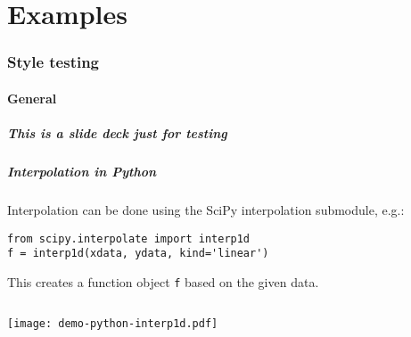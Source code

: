 \part{Examples}
\section{Style testing}
\subsection*{General}
\begin{frame}[label=contents_sample]
  \frametitle{This is a slide deck just for testing}
\end{frame}

{\nologo
\begin{frame}[fragile]
  \frametitle{Interpolation in Python}
  Interpolation can be done using the SciPy interpolation submodule, e.g.:
  \begin{lstlisting}
from scipy.interpolate import interp1d
f = interp1d(xdata, ydata, kind='linear')
  \end{lstlisting}
  This creates a function object \lstinline|f| based on the given data.\pause
  \begin{columns}[T]
        
    \pause
      
      \pause
    \pause
      \texttt{[image: demo-python-interp1d.pdf]}
  \end{columns}
\end{frame}
}
